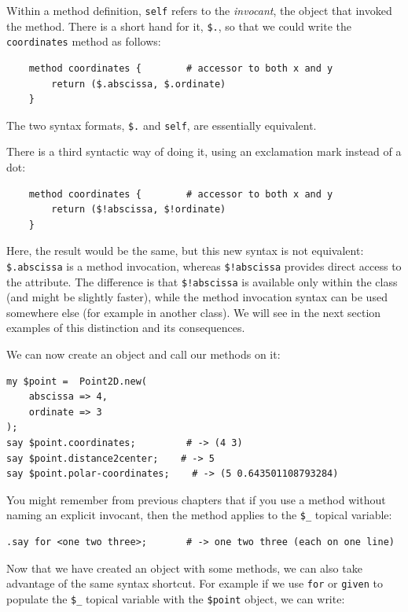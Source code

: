 Within a method definition, {\tt self} refers to the 
\emph{invocant}, the object that invoked the method. 
There is a short hand for it, \verb'$.', so that we could 
write the {\tt coordinates} method as follows:

\begin{verbatim}
    method coordinates {        # accessor to both x and y
        return ($.abscissa, $.ordinate)
    }
\end{verbatim}

The two  syntax formats, \verb'$.' and {\tt self}, are 
essentially equivalent.

There is a third syntactic way of doing it, using an 
exclamation mark instead of a dot:

\begin{verbatim}
    method coordinates {        # accessor to both x and y
        return ($!abscissa, $!ordinate)
    }
\end{verbatim}

Here, the result would be the same, but this new syntax is 
not equivalent: \verb'$.abscissa' is a method invocation, 
whereas \verb'$!abscissa' provides direct access to the attribute.
The difference is that \verb'$!abscissa' is available only 
within the class (and might be slightly faster), while 
the method invocation syntax can be used somewhere else 
(for example in another class). We will see in the next section 
examples of this distinction and its consequences.

We can now create an object and call our methods on it:

\begin{verbatim}
my $point =  Point2D.new(
    abscissa => 4, 
    ordinate => 3
);
say $point.coordinates;         # -> (4 3)
say $point.distance2center;    # -> 5
say $point.polar-coordinates;    # -> (5 0.643501108793284)
\end{verbatim}

You might remember from previous chapters that if you use a method 
without naming an explicit invocant, then the method applies to 
the \verb'$_' topical variable:

\begin{verbatim}
.say for <one two three>;       # -> one two three (each on one line)
\end{verbatim}

Now that we have created an object with some methods, we can also 
take advantage of the same syntax shortcut. For example if we 
use {\tt for} or {\tt given} to populate the \verb'$_' topical 
variable with the \verb'$point' object, we can write:

